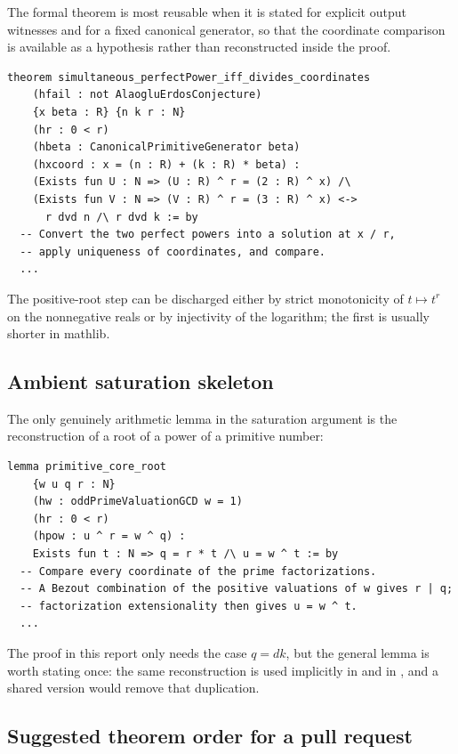 \documentclass[11pt,oneside]{article}
\theoremstyle{definition}
\theoremstyle{remark}
\newcommand{\lean}[1]{\texttt{\detokenize{#1}}}
\begin{document}
The formal theorem is most reusable when it is stated for explicit output witnesses and for a
fixed canonical generator, so that the coordinate comparison is available as a hypothesis
rather than reconstructed inside the proof.

\begin{lstlisting}[style=leanstyle,caption={Common powers: skeleton.},label={a3:lst-power}]
theorem simultaneous_perfectPower_iff_divides_coordinates
    (hfail : not AlaogluErdosConjecture)
    {x beta : R} {n k r : N}
    (hr : 0 < r)
    (hbeta : CanonicalPrimitiveGenerator beta)
    (hxcoord : x = (n : R) + (k : R) * beta) :
    (Exists fun U : N => (U : R) ^ r = (2 : R) ^ x) /\
    (Exists fun V : N => (V : R) ^ r = (3 : R) ^ x) <->
      r dvd n /\ r dvd k := by
  -- Convert the two perfect powers into a solution at x / r,
  -- apply uniqueness of coordinates, and compare.
  ...
\end{lstlisting}

The positive-root step can be discharged either by strict monotonicity of $t\mapsto t^{r}$ on
the nonnegative reals or by injectivity of the logarithm; the first is usually shorter in
mathlib.

\subsection{Ambient saturation skeleton}
\label{a3:saturation-skeleton}

The only genuinely arithmetic lemma in the saturation argument is the reconstruction of a
root of a power of a primitive number:

\begin{lstlisting}[style=leanstyle,caption={Primitive-core root lemma.},label={a3:lst-root}]
lemma primitive_core_root
    {w u q r : N}
    (hw : oddPrimeValuationGCD w = 1)
    (hr : 0 < r)
    (hpow : u ^ r = w ^ q) :
    Exists fun t : N => q = r * t /\ u = w ^ t := by
  -- Compare every coordinate of the prime factorizations.
  -- A Bezout combination of the positive valuations of w gives r | q;
  -- factorization extensionality then gives u = w ^ t.
  ...
\end{lstlisting}

The proof in this report only needs the case $q=dk$, but the general lemma is worth stating
once: the same reconstruction is used implicitly in \lean{PrimitiveOddCore} and in
\lean{OutputNormalization}, and a shared version would remove that duplication.

\subsection{Suggested theorem order for a pull request}
\label{a3:pr-order}
\end{document}

